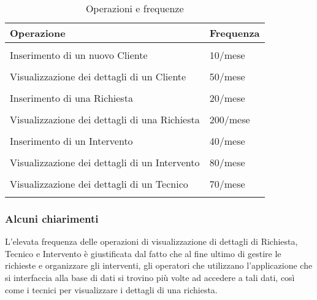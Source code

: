 \documentclass{article}
\begin{document}
\begin{table}[h]
    \centering
    \begin{tabular}{|m{10cm} m{3cm}|}
        \hline 
        \textbf{Operazione} & \textbf{Frequenza} \\ 
        
        \hline & \\   
        Inserimento di un nuovo Cliente & 10/mese \\&\\

        Visualizzazione dei dettagli di un Cliente & 50/mese \\&\\
        
        Inserimento di una Richiesta & 20/mese \\&\\
        
        Visualizzazione dei dettagli di una Richiesta & 200/mese \\&\\

        Inserimento di un Intervento & 40/mese \\&\\

        Visualizzazione dei dettagli di un Intervento & 80/mese \\&\\

        Visualizzazione dei dettagli di un Tecnico & 70/mese \\&\\

        \hline
    
    \end{tabular}
    \caption{Operazioni e frequenze}
    \label{tab:my_label}
\end{table}

\subsubsection{Alcuni chiarimenti}

L'elevata frequenza delle operazioni di visualizzazione di dettagli di Richiesta, Tecnico e Intervento è giustificata dal fatto che al fine ultimo di gestire le richieste e organizzare gli interventi, gli operatori che utilizzano l'applicazione che si interfaccia alla base di dati si trovino più volte ad accedere a tali dati, così come i tecnici per visualizzare i dettagli di una richiesta.
\newpage
\end{document}
